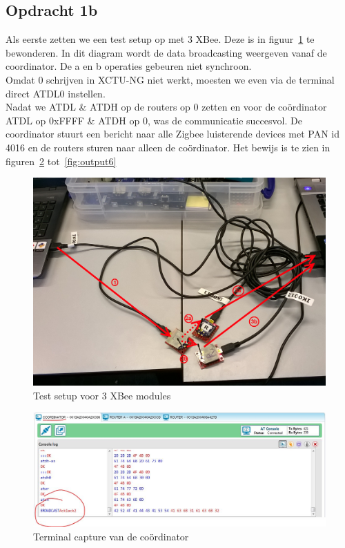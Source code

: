 \documentclass[12pt]{article}
\begin{document}
\subsection*{Opdracht 1b}
Als eerste zetten we een test setup op met 3 XBee. Deze is in figuur~\ref{fig:setup2} te bewonderen. In dit diagram wordt de data broadcasting weergeven vanaf de coordinator. De a en b operaties gebeuren niet synchroon.\\
Omdat 0 schrijven in XCTU-NG niet werkt, moesten we even via de terminal direct ATDL0 instellen. \\
Nadat we ATDL \& ATDH op de routers op 0 zetten en voor de co\"{o}rdinator ATDL op 0xFFFF \& ATDH op 0, was de communicatie succesvol. De coordinator stuurt een bericht naar alle Zigbee luisterende devices met PAN id 4016 en de routers sturen naar alleen de co\"{o}rdinator. Het bewijs is te zien in figuren~\ref{fig:output4} tot~\ref{fig:output6}
\begin{center}
\begin{figure}[h]
\includegraphics[scale=.25]{Test_Setup_2.jpg}
\caption{Test setup voor 3 XBee modules}
\label{fig:setup2}
\end{figure}
\end{center}
\begin{center}
\begin{figure}[h]
\includegraphics[scale=.7]{coord_capture.JPG}
\caption{Terminal capture van de co\"{o}rdinator}
\label{fig:output4}
\end{figure}
\end{center}
\end{document}
